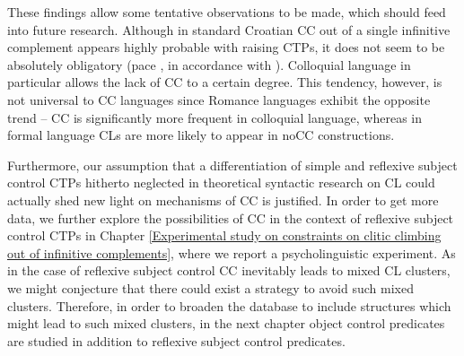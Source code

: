 These findings allow some tentative observations to be made, which should feed into future research. Although in standard Croatian CC out of a single infinitive complement appears highly probable with raising CTPs, it does not seem to be absolutely obligatory (pace \citealt{Aljovic05}, in accordance with \citealt*{HKJ18}). Colloquial language in particular allows the lack of CC to a certain degree. This tendency, however, is not universal to CC languages since Romance languages exhibit the opposite trend – CC is significantly more frequent in colloquial language, whereas in formal language CLs are more likely to appear in noCC constructions.

Furthermore, our assumption that a differentiation of simple and reflexive subject control CTPs hitherto neglected in theoretical syntactic research on CL could actually shed new light on mechanisms of CC is justified. In order to get more data, we further explore the possibilities of CC in the context of reflexive subject control CTPs in Chapter \ref{Experimental study on constraints on clitic climbing out of infinitive complements}, where we report a psycholinguistic experiment. As in the case of reflexive subject control CC inevitably leads to mixed CL clusters, we might conjecture that there could exist a strategy to avoid such mixed clusters. Therefore, in order to broaden the database to include structures which might lead to such mixed clusters, in the next chapter object control predicates are studied in addition to reflexive subject control predicates.
